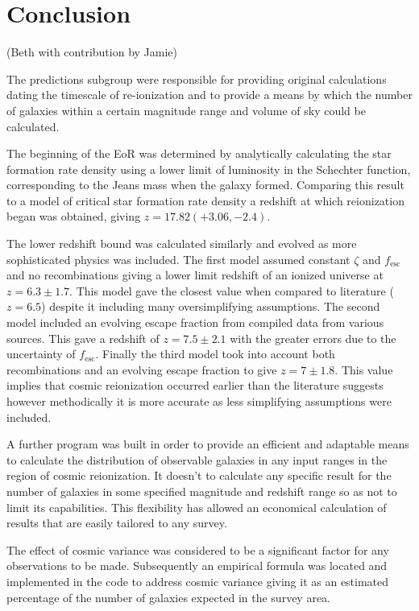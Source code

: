 \newpage
\section{Conclusion} %
\label{sec:conclusion}
(Beth with contribution by Jamie)

	The predictions subgroup were responsible for providing original calculations dating the timescale of re-ionization and to provide a means by which the number of galaxies within a certain magnitude range and volume of sky could be calculated.

	The beginning of the EoR was determined by analytically calculating the star formation rate density using a lower limit of luminosity in the Schechter function, corresponding to the Jeans mass when the galaxy formed. Comparing this result to a model of critical star formation rate density a redshift at which reionization began was obtained, giving $z=17.82(+3.06, -2.4)$.

	The lower redshift bound was calculated similarly and evolved as more sophisticated physics was included. The first model assumed constant $\zeta$ and $f_\text{esc}$ and no recombinations giving a lower limit redshift of an ionized universe at $z=6.3\pm 1.7$. This model gave the closest value when compared to literature ($z=6.5$\cite{OtaarXiv0707.1561}) despite it including many oversimplifying assumptions. The second model included an evolving escape fraction from compiled data from various sources. This gave a redshift of $z=7.5\pm 2.1$ with the greater errors due to the uncertainty of $f_\text{esc}$. Finally the third model took into account both recombinations and an evolving escape fraction to give $z=7\pm 1.8$. This value implies that cosmic reionization occurred earlier than the literature suggests however methodically it is more accurate as less simplifying assumptions were included.

	A further program was built in order to provide an efficient and adaptable means to calculate the distribution of observable galaxies in any input ranges in the region of cosmic reionization. It doesn't to calculate any specific result for the number of galaxies in some specified magnitude and redshift range so as not to limit its capabilities. This flexibility has allowed an economical calculation of results that are easily tailored to any survey.

	The effect of cosmic variance was considered to be a significant factor for any observations to be made.
	Subsequently an empirical formula was located and implemented in the code to address cosmic variance giving it as an estimated percentage of the number of galaxies expected in the survey area.
